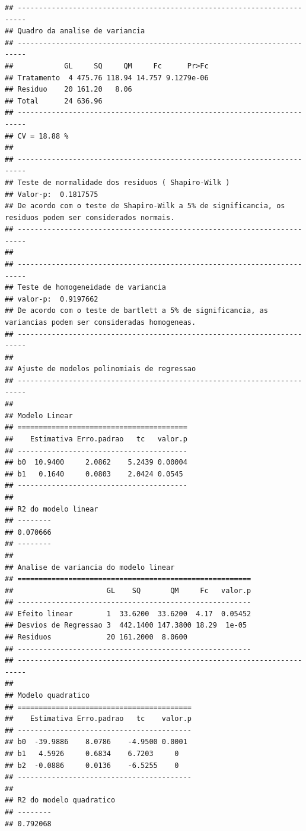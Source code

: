 \documentclass[
]{book}
\begin{document}
\begin{verbatim}
## ------------------------------------------------------------------------
## Quadro da analise de variancia
## ------------------------------------------------------------------------
##            GL     SQ     QM     Fc      Pr>Fc
## Tratamento  4 475.76 118.94 14.757 9.1279e-06
## Residuo    20 161.20   8.06                  
## Total      24 636.96                         
## ------------------------------------------------------------------------
## CV = 18.88 %
## 
## ------------------------------------------------------------------------
## Teste de normalidade dos residuos ( Shapiro-Wilk ) 
## Valor-p:  0.1817575 
## De acordo com o teste de Shapiro-Wilk a 5% de significancia, os residuos podem ser considerados normais.
## ------------------------------------------------------------------------
## 
## ------------------------------------------------------------------------
## Teste de homogeneidade de variancia 
## valor-p:  0.9197662 
## De acordo com o teste de bartlett a 5% de significancia, as variancias podem ser consideradas homogeneas.
## ------------------------------------------------------------------------
## 
## Ajuste de modelos polinomiais de regressao
## ------------------------------------------------------------------------
## 
## Modelo Linear
## ========================================
##    Estimativa Erro.padrao   tc   valor.p
## ----------------------------------------
## b0  10.9400     2.0862    5.2439 0.00004
## b1   0.1640     0.0803    2.0424 0.0545 
## ----------------------------------------
## 
## R2 do modelo linear
## --------
## 0.070666
## --------
## 
## Analise de variancia do modelo linear
## =======================================================
##                      GL    SQ       QM     Fc   valor.p
## -------------------------------------------------------
## Efeito linear        1  33.6200  33.6200  4.17  0.05452
## Desvios de Regressao 3  442.1400 147.3800 18.29  1e-05 
## Residuos             20 161.2000  8.0600               
## -------------------------------------------------------
## ------------------------------------------------------------------------
## 
## Modelo quadratico
## =========================================
##    Estimativa Erro.padrao   tc    valor.p
## -----------------------------------------
## b0  -39.9886    8.0786    -4.9500 0.0001 
## b1   4.5926     0.6834    6.7203     0   
## b2  -0.0886     0.0136    -6.5255    0   
## -----------------------------------------
## 
## R2 do modelo quadratico
## --------
## 0.792068

\end{verbatim}
\end{document}
